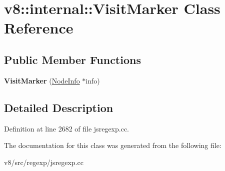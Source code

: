 \hypertarget{classv8_1_1internal_1_1VisitMarker}{}\section{v8\+:\+:internal\+:\+:Visit\+Marker Class Reference}
\label{classv8_1_1internal_1_1VisitMarker}
\subsection*{Public Member Functions}
\begin{DoxyCompactItemize}
\item 
\mbox{\label{classv8_1_1internal_1_1VisitMarker_aaab40ec219c01202a8effd592f8922b1}} 
{\bfseries Visit\+Marker} (\mbox{\hyperlink{structv8_1_1internal_1_1NodeInfo}{Node\+Info}} $\ast$info)
\end{DoxyCompactItemize}


\subsection{Detailed Description}


Definition at line 2682 of file jsregexp.\+cc.



The documentation for this class was generated from the following file\+:\begin{DoxyCompactItemize}
\item 
v8/src/regexp/jsregexp.\+cc\end{DoxyCompactItemize}
